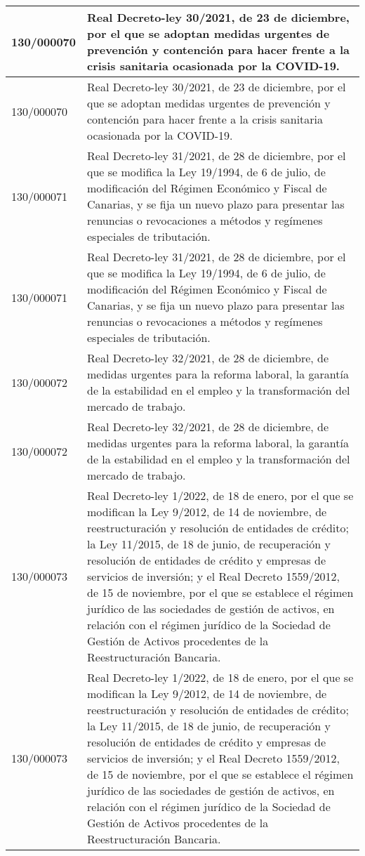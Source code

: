 {\begin{table}[H]
\begin{center}
\begin{tabularx}{\linewidth}{| l | X |}
\hline
130/000070 & Real Decreto-ley 30/2021, de 23 de diciembre, por el que se adoptan medidas urgentes de prevención y contención para hacer frente a la crisis sanitaria ocasionada por la COVID-19. \\
\hline
130/000070 & Real Decreto-ley 30/2021, de 23 de diciembre, por el que se adoptan medidas urgentes de prevención y contención para hacer frente a la crisis sanitaria ocasionada por la COVID-19. \\
\hline
130/000071 & Real Decreto-ley 31/2021, de 28 de diciembre, por el que se modifica la Ley 19/1994, de 6 de julio, de modificación del Régimen Económico y Fiscal de Canarias, y se fija un nuevo plazo para presentar las renuncias o revocaciones a métodos y regímenes especiales de tributación. \\
\hline
130/000071 & Real Decreto-ley 31/2021, de 28 de diciembre, por el que se modifica la Ley 19/1994, de 6 de julio, de modificación del Régimen Económico y Fiscal de Canarias, y se fija un nuevo plazo para presentar las renuncias o revocaciones a métodos y regímenes especiales de tributación. \\
\hline
130/000072 & Real Decreto-ley 32/2021, de 28 de diciembre, de medidas urgentes para la reforma laboral, la garantía de la estabilidad en el empleo y la transformación del mercado de trabajo. \\
\hline
130/000072 & Real Decreto-ley 32/2021, de 28 de diciembre, de medidas urgentes para la reforma laboral, la garantía de la estabilidad en el empleo y la transformación del mercado de trabajo. \\
\hline
130/000073 & Real Decreto-ley 1/2022, de 18 de enero, por el que se modifican la Ley 9/2012, de 14 de noviembre, de reestructuración y resolución de entidades de crédito; la Ley 11/2015, de 18 de junio, de recuperación y resolución de entidades de crédito y empresas de servicios de inversión; y el Real Decreto 1559/2012, de 15 de noviembre, por el que se establece el régimen jurídico de las sociedades de gestión de activos, en relación con el régimen jurídico de la Sociedad de Gestión de Activos procedentes de la Reestructuración Bancaria. \\
\hline
130/000073 & Real Decreto-ley 1/2022, de 18 de enero, por el que se modifican la Ley 9/2012, de 14 de noviembre, de reestructuración y resolución de entidades de crédito; la Ley 11/2015, de 18 de junio, de recuperación y resolución de entidades de crédito y empresas de servicios de inversión; y el Real Decreto 1559/2012, de 15 de noviembre, por el que se establece el régimen jurídico de las sociedades de gestión de activos, en relación con el régimen jurídico de la Sociedad de Gestión de Activos procedentes de la Reestructuración Bancaria. \\

\end{tabularx}
\end{center}
\end{table}}
